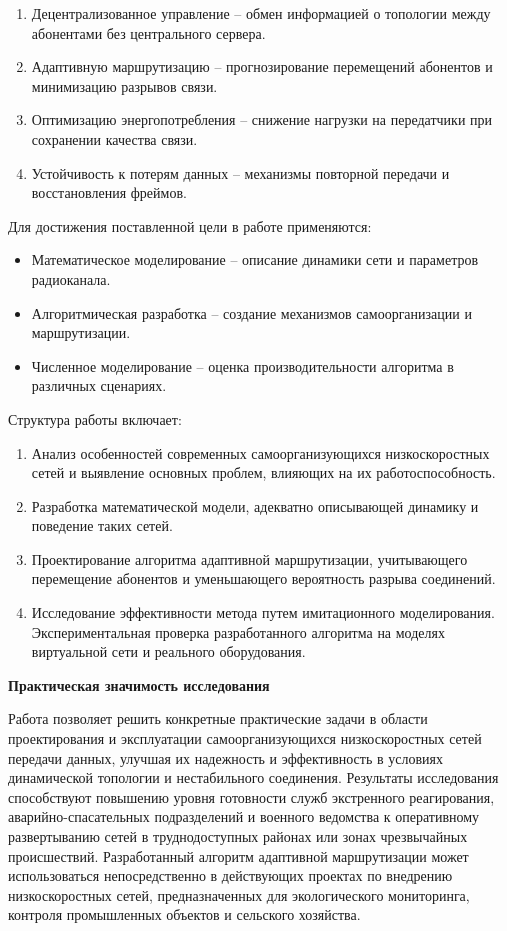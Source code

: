 \begin{enumerate}[1.]
	\item Децентрализованное управление – обмен информацией о топологии между абонентами без центрального сервера.

    \item Адаптивную маршрутизацию – прогнозирование перемещений абонентов и минимизацию разрывов связи.

    \item Оптимизацию энергопотребления – снижение нагрузки на передатчики при сохранении качества связи.

    \item Устойчивость к потерям данных – механизмы повторной передачи и восстановления фреймов.
\end{enumerate}

Для достижения поставленной цели в работе применяются:
\begin{itemize}
	\item Математическое моделирование – описание динамики сети и параметров радиоканала.

    \item Алгоритмическая разработка – создание механизмов самоорганизации и маршрутизации.

    \item Численное моделирование – оценка производительности алгоритма в различных сценариях.
\end{itemize}

Структура работы включает:
\begin{enumerate}[1.]
	\item Анализ особенностей современных самоорганизующихся низкоскоростных сетей и выявление основных проблем, влияющих на их работоспособность.
    \item Разработка математической модели, адекватно описывающей динамику и поведение таких сетей.
    \item Проектирование алгоритма адаптивной маршрутизации, учитывающего перемещение абонентов и уменьшающего вероятность разрыва соединений.
    \item Исследование эффективности метода путем имитационного моделирования. Экспериментальная проверка разработанного алгоритма на моделях виртуальной сети и реального оборудования.
\end{enumerate}

\noindent\textbf{Практическая значимость исследования}  

Работа позволяет решить конкретные практические задачи в области проектирования и эксплуатации самоорганизующихся низкоскоростных сетей передачи данных, улучшая их надежность и эффективность в условиях динамической топологии и нестабильного соединения.
    Результаты исследования способствуют повышению уровня готовности служб экстренного реагирования, аварийно-спасательных подразделений и военного ведомства к оперативному развертыванию сетей в труднодоступных районах или зонах чрезвычайных происшествий.
    Разработанный алгоритм адаптивной маршрутизации может использоваться непосредственно в действующих проектах по внедрению низкоскоростных сетей, предназначенных для экологического мониторинга, контроля промышленных объектов и сельского хозяйства.

